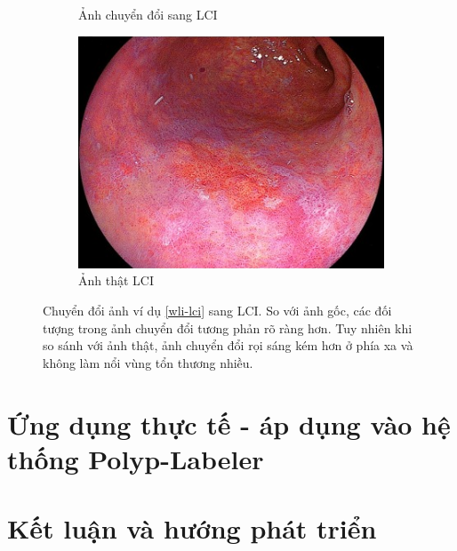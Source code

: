 \documentclass[12pt]{extreport}
\begin{document}
\begin{figure}[H]
\begin{subfigure}[H]{0.32\textwidth}
        \caption{Ảnh chuyển đổi sang LCI}
    \end{subfigure}
    \begin{subfigure}[H]{0.32\textwidth}
        \centering
        \includegraphics[width=\linewidth]{example/lci_real.png}
        \caption{Ảnh thật LCI}
    \end{subfigure}
    \caption{Chuyển đổi ảnh ví dụ \ref{wli-lci} sang LCI. So với ảnh gốc, các đối tượng trong ảnh chuyển đổi tương phản rõ ràng hơn. Tuy nhiên khi so sánh với ảnh thật, ảnh chuyển đổi rọi sáng kém hơn ở phía xa và không làm nổi vùng tổn thương nhiều.}
\end{figure}

\chapter{Ứng dụng thực tế - áp dụng vào hệ thống Polyp-Labeler}
\label{application-polyp-labeler}

\chapter{Kết luận và hướng phát triển}

\newpage


\end{document}
